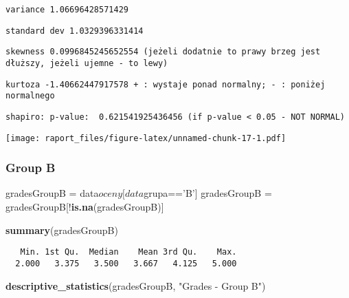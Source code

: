 \documentclass[]{article}
\newenvironment{Shaded}{\begin{snugshade}}{\end{snugshade}}
\newcommand{\KeywordTok}[1]{\textcolor[rgb]{0.13,0.29,0.53}{\textbf{{#1}}}}
\newcommand{\StringTok}[1]{\textcolor[rgb]{0.31,0.60,0.02}{{#1}}}
\newcommand{\NormalTok}[1]{{#1}}
\begin{document}
\begin{verbatim}
variance 1.06696428571429
\end{verbatim}

\begin{verbatim}
standard dev 1.0329396331414
\end{verbatim}

\begin{verbatim}
skewness 0.0996845245652554 (jeżeli dodatnie to prawy brzeg jest dłuższy, jeżeli ujemne - to lewy)
\end{verbatim}

\begin{verbatim}
kurtoza -1.40662447917578 + : wystaje ponad normalny; - : poniżej normalnego
\end{verbatim}

\begin{verbatim}
shapiro: p-value:  0.621541925436456 (if p-value < 0.05 - NOT NORMAL)
\end{verbatim}

\texttt{[image: raport\_files/figure-latex/unnamed-chunk-17-1.pdf]}

\subsubsection{Group B}\label{group-b-1}

\begin{Shaded}
\begin{Highlighting}[]
\NormalTok{gradesGroupB =}\StringTok{ }\NormalTok{data$oceny[data$grupa==}\StringTok{'B'}\NormalTok{]}
\NormalTok{gradesGroupB =}\StringTok{ }\NormalTok{gradesGroupB[!}\KeywordTok{is.na}\NormalTok{(gradesGroupB)]}
\end{Highlighting}
\end{Shaded}

\begin{Shaded}
\begin{Highlighting}[]
\KeywordTok{summary}\NormalTok{(gradesGroupB)}
\end{Highlighting}
\end{Shaded}

\begin{verbatim}
   Min. 1st Qu.  Median    Mean 3rd Qu.    Max. 
  2.000   3.375   3.500   3.667   4.125   5.000 
\end{verbatim}

\begin{Shaded}
\begin{Highlighting}[]
\KeywordTok{descriptive_statistics}\NormalTok{(gradesGroupB, }\StringTok{"Grades - Group  B"}\NormalTok{)}
\end{Highlighting}
\end{Shaded}
\end{document}
